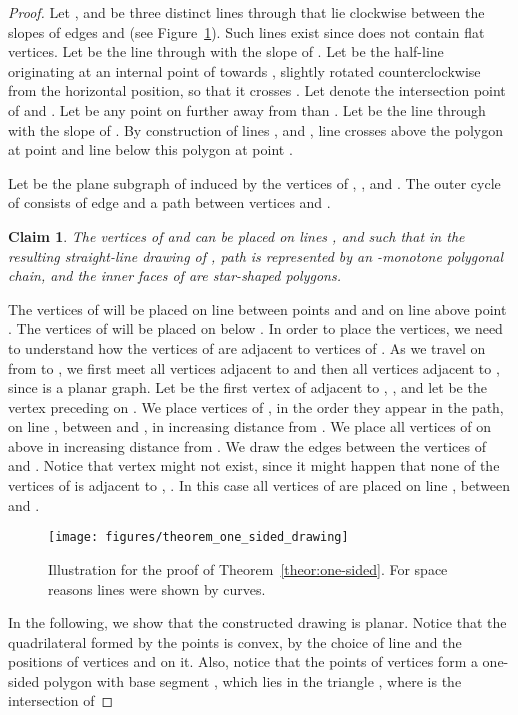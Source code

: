 \documentclass{llncs}
\newtheorem{stat}{Claim}
\begin{document}
\begin{proof}
Let ,  and  be three distinct lines through  that lie clockwise between the slopes of edges  and  (see Figure~\ref{fig:one_sided}). Such lines exist since  does not contain flat vertices. 
Let  be the line through  with the slope of . Let  be the half-line originating at an internal point of  towards , slightly rotated counterclockwise from the horizontal position, so that it crosses . Let  denote the intersection point of  and . Let  be any point on  further away from  than . Let  be the line through  with the slope of . By construction of lines ,  and ,  line  crosses  above the polygon  at point  and line  below this polygon at point .  

Let  be the plane subgraph of  induced by the vertices of , , and . The outer cycle of  consists of edge  and a path  between vertices  and .
\begin{stat}
The vertices of  and  can be placed on lines ,  and   such that in the resulting straight-line drawing of , path  is represented by an -monotone polygonal chain, and the inner faces of  are star-shaped polygons.
\end{stat}
The vertices of  will be placed on line  between points  and  and on line  above point . The vertices of  will be placed on  below .
In order to place the vertices, we need to understand how the vertices of  are adjacent to vertices of .
As we travel on  from  to , we first meet all vertices adjacent to  and then all vertices adjacent to , since  is a planar graph. Let  be the first vertex of  adjacent to , , and let  be the vertex preceding  on . We place vertices of , in the order they appear in the path, on line , between  and , in increasing distance from . We place all vertices of  on  above  in increasing distance from . We draw the edges between the vertices of  and .  Notice that vertex  might not exist, since it might happen that none of the vertices of  is adjacent to , . In this case all vertices of  are placed on line , between  and .
\begin{figure}[t]
 \centering
 {\texttt{[image: figures/theorem\_one\_sided\_drawing]}}
 \caption{Illustration for the proof of Theorem~\ref{theor:one-sided}. For space reasons lines were shown by curves.}
 \label{fig:one_sided} 
\end{figure}  
In the following, we show that the constructed drawing is planar. Notice that the quadrilateral formed by the points  is convex, by the choice of line  and the positions of vertices  and  on it. Also, notice that the points of vertices  form a one-sided polygon with base segment , which lies in the triangle , where  is the intersection of 

\end{proof}
\end{document}
